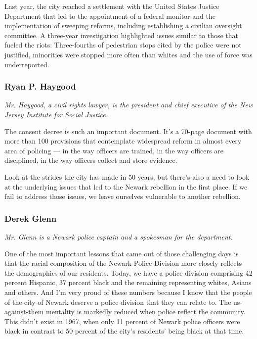 Last year, the city reached a settlement with the United States Justice
Department that led to the appointment of a federal monitor and the
implementation of sweeping reforms, including establishing a civilian
oversight committee. A three-year investigation highlighted issues
similar to those that fueled the riots: Three-fourths of pedestrian
stops cited by the police were not justified, minorities were stopped
more often than whites and the use of force was underreported.

\hypertarget{ryan-p-haygood}{%
\subsubsection{Ryan P. Haygood}\label{ryan-p-haygood}}

\emph{Mr. Haygood, a civil rights lawyer, is the president and chief
executive of the New Jersey Institute for Social Justice.}

The consent decree is such an important document. It's a 70-page
document with more than 100 provisions that contemplate widespread
reform in almost every area of policing --- in the way officers are
trained, in the way officers are disciplined, in the way officers
collect and store evidence.

Look at the strides the city has made in 50 years, but there's also a
need to look at the underlying issues that led to the Newark rebellion
in the first place. If we fail to address those issues, we leave
ourselves vulnerable to another rebellion.

\hypertarget{derek-glenn}{%
\subsubsection{Derek Glenn}\label{derek-glenn}}

\emph{Mr. Glenn is a Newark police captain and a spokesman for the
department.}

One of the most important lessons that came out of those challenging
days is that the racial composition of the Newark Police Division more
closely reflects the demographics of our residents. Today, we have a
police division comprising 42 percent Hispanic, 37 percent black and the
remaining representing whites, Asians and others. And I'm very proud of
these numbers because I know that the people of the city of Newark
deserve a police division that they can relate to. The us-against-them
mentality is markedly reduced when police reflect the community. This
didn't exist in 1967, when only 11 percent of Newark police officers
were black in contrast to 50 percent of the city's residents' being
black at that time.

